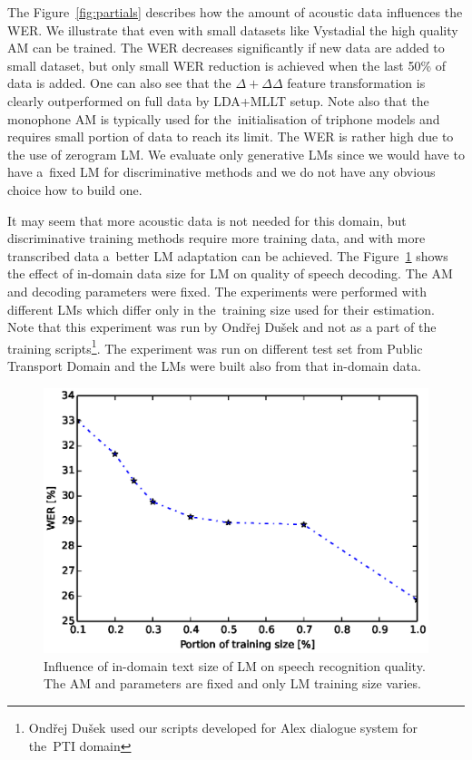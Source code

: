 The Figure~\ref{fig:partials} describes how the amount of acoustic data influences the \ac{WER}.
We illustrate that even with small datasets like Vystadial the high quality \ac{AM} can be trained.
The WER decreases significantly if new data are added to small dataset, but only small \ac{WER} reduction is achieved when the last 50\% of data is added.
One can also see that the $\Delta+\Delta\Delta$ feature transformation is clearly outperformed on full data by \ac{LDA}+\ac{MLLT} setup.
Note also that the monophone \ac{AM} is typically used for the~initialisation of triphone models and requires small portion of data to reach its limit.
The WER is rather high due to the use of zerogram \ac{LM}.
We evaluate only generative \acp{LM} since we would have to have a~fixed LM for discriminative methods and we do not have any obvious choice how to build one.

It may seem that more acoustic data is not needed for this domain, but discriminative training methods require more training data, and with more transcribed data a~better \ac{LM} adaptation can be achieved.
The Figure~\ref{fig:partials_lm} shows the effect of in-domain data size for \ac{LM} on quality of speech decoding.
The \ac{AM}  and decoding parameters were fixed.
The experiments were performed with different \acp{LM} which differ only in the~training size used for their estimation. 
Note that this experiment was run by Ondřej Dušek and not as a part of the training scripts\footnote{Ondřej Dušek used our scripts developed for Alex dialogue system for the~\ac{PTI} domain}.
The experiment was run on different test set from Public Transport Domain and the \acp{LM} were built also from that in-domain data.
\begin{figure}[!htp]
    \begin{center}
    \includegraphics[scale=0.7]{images/partial-lm-tri2b-bmmi.ps}
    \caption{Influence of in-domain text size of \ac{LM} on speech recognition quality. The \ac{AM}  and parameters are fixed and only \ac{LM} training size varies.}
    \label{fig:partials_lm} 
    \end{center}
\end{figure}

